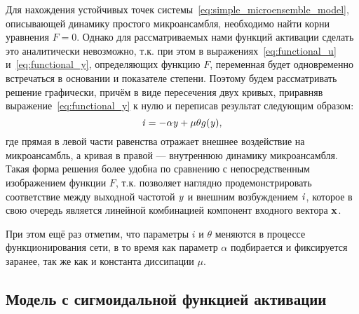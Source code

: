 Для нахождения устойчивых точек системы~\eqref{eq:simple_microensemble_model}, описывающей динамику простого микроансамбля, необходимо найти корни уравнения $F = 0$. Однако для рассматриваемых нами функций активации сделать это аналитически невозможно, т.к. при этом в выражениях~\eqref{eq:functional_u} и~\eqref{eq:functional_y}, определяющих функцию $F$, переменная будет одновременно встречаться в основании и показателе степени. Поэтому будем рассматривать решение графически, причём в виде пересечения двух кривых, приравняв выражение~\eqref{eq:functional_y} к нулю и переписав результат следующим образом:
\begin{equation}
    \label{eq:graphic_solution}
    \mathit{i} = - \alpha \mathit{y} + \mu \theta g(\mathit{y}),
\end{equation}
где прямая в левой части равенства отражает внешнее воздействие на микроансамбль, а кривая в правой --- внутреннюю динамику микроансамбля. Такая форма решения более удобна по сравнению с непосредственным изображением функции $F$, т.к. позволяет наглядно продемонстрировать соответствие между выходной частотой $\mathit{y}$ и внешним возбуждением $\mathit{i}$, которое в свою очередь является линейной комбинацией компонент входного вектора $\mathrm{\mathbf{x}}$.

При этом ещё раз отметим, что параметры $i$ и $\theta$ меняются в процессе функционирования сети, в то время как параметр $\alpha$ подбирается и фиксируется заранее, так же как и константа диссипации $\mu$.

\subsection{Модель с сигмоидальной функцией активации} \label{subsection:analysis_sigm}


